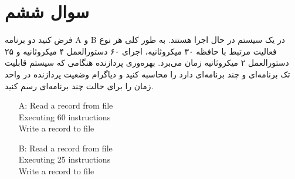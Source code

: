\section{سوال ششم}

فرض کنید دو برنامه A و B در یک سیستم در حال اجرا هستند. به طور کلی هر نوع فعالیت مرتبط با حافظه ۳۰ میکروثانیه، اجرای ۶۰ دستورالعمل ۴ میکروثانیه و ۲۵ دستورالعمل ۲ میکروثانیه زمان می‌برد. بهره‌وری پردازنده هنگامی که سیستم قابلیت تک برنامه‌ای و چند برنامه‌ای دارد را محاسبه کنید و دیاگرام وضعیت پردازنده در واحد زمان را برای حالت چند برنامه‌ای رسم کنید.

\begin{latin}
	\begin{enumerate}
		\item [A:] 
		Read a record from file \\
		Executing 60 instructions \\
		Write a record to file
		
		\item [B:]
		Read a record from file \\
		Executing 25 instructions \\
		Write a record to file
	\end{enumerate}
\end{latin}

\begin{qsolve}
	
\end{qsolve}